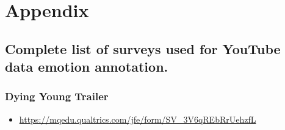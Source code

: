 \documentclass{article}
\newenvironment{subs}
  {\adjustwidth{3em}{0pt}}
  {\endadjustwidth}
\begin{document}
\newpage
\printbibliography
%
%

\newpage
\section*{Appendix}
\begin{subappendices}
    \subsection*{Complete list of surveys used for YouTube data emotion annotation.}
    \begin{subs}
        \subsubsection*{Dying Young Trailer}
            \begin{itemize}
                \item \url{https://mqedu.qualtrics.com/jfe/form/SV_3V6qREbRrUehzfL}
            \end{itemize}
            

\end{subs}
\end{subappendices}
\end{document}
